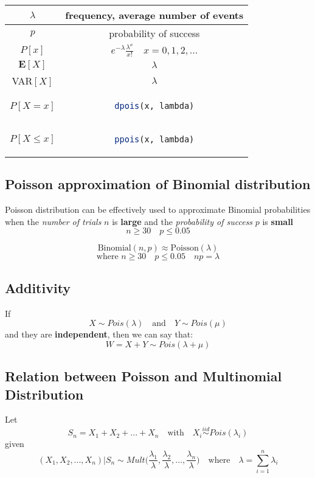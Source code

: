 \begingroup
\setlength{\tabcolsep}{10pt} %
\renewcommand{\arraystretch}{1.5} %
\begin{center}
\begin{tabular}{ |c|c| } 
\hline
\(\lambda\) & frequency, average number of events \\ \hline
\(p\) & probability of success \\ \hline
\(P[x]\) & $e^{-\lambda} \frac{\lambda^x}{x!} \quad x = 0,1,2,...$\\ \hline
\(\mathbf{E}[X]\) & \(\lambda\) \\ \hline
VAR\([X]\) & \(\lambda\) \\ \hline\hline
\(P[X = x]\) & \begin{lstlisting}[language=R]
dpois(x, lambda)
\end{lstlisting} \\ \hline
\(P[X \leq x]\) & \begin{lstlisting}[language=R]
ppois(x, lambda)
\end{lstlisting} \\ \hline
\end{tabular}
\end{center}
\endgroup

\newpage
\subsection{Poisson approximation of Binomial distribution}
Poisson distribution can be effectively used to approximate Binomial probabilities when the \textit{number of trials} \(n\) is \textbf{large} and the \textit{probability of success} \(p\) is \textbf{small}
\[n \geq 30 \quad p \leq 0.05\]

\[\text{Binomial}(n,p) \approx \text{Poisson}(\lambda)\]
\[\text{where } n \geq 30 \quad p \leq 0.05 \quad np=\lambda\]

\subsection{Additivity}
If
\[X \sim Pois(\lambda) \quad \text{and} \quad Y \sim Pois(\mu)\]
and they are \textbf{independent}, then we can say that:
\[W = X + Y \sim Pois(\lambda + \mu)\]

\subsection{Relation between Poisson and Multinomial Distribution}
Let 
\[S_n = X_1 + X_2 + ... + X_n \quad \text{with} \quad X_i\stackrel{iid}{\sim} Pois(\lambda_i)\]
given
\[(X_1,X_2,...,X_n)|S_n \sim Mult\Big(\frac{\lambda_1}{\lambda},\frac{\lambda_2}{\lambda},...,\frac{\lambda_n}{\lambda}\Big) \quad \text{where} \quad \lambda = \sum_{i = 1}^n \lambda_i\]